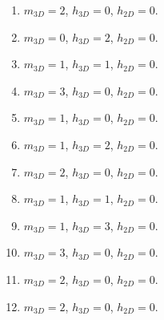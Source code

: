 \documentclass[10pt,fleqn]{article} %
\begin{document}
\begin{multicols}{2}
\vspace{1cm}

\begin{multicols}{2}
\begin{enumerate}
\item $m_{3D}=2$, $h_{3D}=0$, $h_{2D}=0$.
\item $m_{3D}=0$, $h_{3D}=2$, $h_{2D}=0$.
\item $m_{3D}=1$, $h_{3D}=1$, $h_{2D}=0$.
\item $m_{3D}=3$, $h_{3D}=0$, $h_{2D}=0$.
\item $m_{3D}=1$, $h_{3D}=0$, $h_{2D}=0$.
\item $m_{3D}=1$, $h_{3D}=2$, $h_{2D}=0$.
\item $m_{3D}=2$, $h_{3D}=0$, $h_{2D}=0$.
\item $m_{3D}=1$, $h_{3D}=1$, $h_{2D}=0$.
\item $m_{3D}=1$, $h_{3D}=3$, $h_{2D}=0$.
\item $m_{3D}=3$, $h_{3D}=0$, $h_{2D}=0$.
\item $m_{3D}=2$, $h_{3D}=0$, $h_{2D}=0$.
\item $m_{3D}=2$, $h_{3D}=0$, $h_{2D}=0$.
\end{enumerate}

\end{multicols}
\end{multicols}
\end{document}

